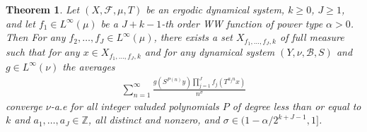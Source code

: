 \documentclass[11pt, oneside]{amsart}   	%
\newcommand{\1}{\mathbbm{1}}
\newtheorem{theorem}{Theorem}[section]
\theoremstyle{definition}
\begin{document}
\begin{theorem}\label{T:polynomial return times hilbert trans}
Let $(X, \mathcal{F}, \mu, T)$ be an ergodic dynamical system, $k\geq0$, $J\geq 1$, and let $f_1\in L^\infty(\mu)$ be a $J + k - 1$-th order WW function of power type $\alpha > 0$. Then For any $f_2, \dots, f_{J} \in L^\infty(\mu)$, there exists a set $X_{f_1, \dots, f_{J}, k}$ of full measure such that for any $x\in X_{f_1, \dots, f_J, k}$ and for any dynamical system $(Y, \nu, \mathcal{B}, S)$ and $g\in L^\infty(\nu)$ the averages
\begin{align*}
\sum_{n=1}^\infty \frac{g(S^{P(n)}y) \prod_{j=1}^J f_j(T^{a_j n}x)}{n^\sigma}
\end{align*}
converge $\nu$-a.e for all integer valuded polynomials $P$ of degree less than or equal to $k$ and $a_1, \dots, a_J\in \mathbb{Z}$, all distinct and nonzero, and $\sigma\in (1 - \alpha/2^{k+J-1}, 1]$.
\end{theorem}
\end{document}

